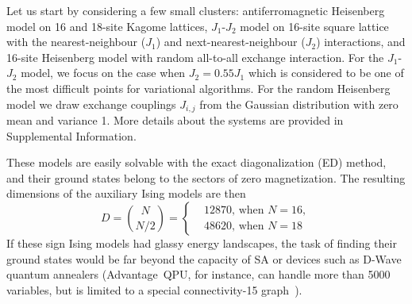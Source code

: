 
Let us start by considering a few small clusters: antiferromagnetic Heisenberg model on 16 and 18-site Kagome lattices, $J_1$-$J_2$ model on 16-site square lattice with the nearest-neighbour ($J_1$) and next-nearest-neighbour ($J_2$) interactions, and 16-site Heisenberg model with random all-to-all exchange interaction. For the $J_1$-$J_2$ model, we focus on the case when $J_2 = 0.55 J_1$ which is considered to be one of the most difficult points for variational algorithms. For the random Heisenberg model we draw exchange couplings $J_{i,j}$ from the Gaussian distribution with zero mean and variance 1. More details about the systems are provided in Supplemental Information.

These models are easily solvable with the exact diagonalization (ED) method, and their ground states belong to the sectors of zero magnetization. The resulting dimensions of the auxiliary Ising models are then
\begin{equation*}
    D = \binom{N}{N/2} 
      = \left\{
      \begin{aligned}
         &12870\mbox{, when }N=16, \\
         &48620\mbox{, when }N=18
      \end{aligned}
      \right.
\end{equation*}
If these sign Ising models had glassy energy landscapes, the task of finding their ground states would be far beyond the capacity of SA or devices such as D-Wave quantum annealers (Advantage\texttrademark\ QPU, for instance, can handle more than 5000 variables, but is limited to a special connectivity-15 graph~\cite{boothby2020next}).

